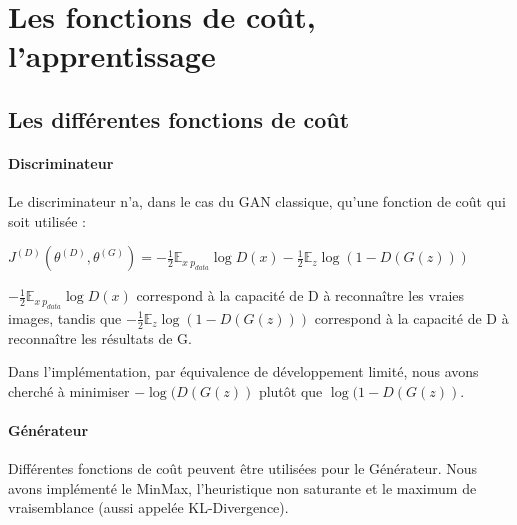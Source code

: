 \section{Les fonctions de coût, l'apprentissage}

\subsection{Les différentes fonctions de coût}
\paragraph{Discriminateur}
Le discriminateur n'a, dans le cas du GAN classique, qu'une fonction de coût qui soit utilisée : \\
\begin{center}
$J^{(D)}(\theta^{(D)}, \theta^{(G)}) = -\frac{1}{2}\mathbb{E}_{x~p_{data}}\log{D(x)}-\frac{1}{2}\mathbb{E}_{z}\log{(1-D(G(z)))}$
\end{center}
\vspace{8pt}
$-\frac{1}{2}\mathbb{E}_{x~p_{data}}\log{D(x)}$ correspond à la capacité de D à reconnaître les vraies images, tandis que $-\frac{1}{2}\mathbb{E}_{z}\log{(1-D(G(z)))}$ correspond à la capacité de D à reconnaître les résultats de G.

\begin{remark}
Dans l'implémentation, par équivalence de développement limité, nous avons cherché à minimiser $-\log{(D(G(z))}$ plutôt que $\log(1-D(G(z))$.
\end{remark}
\paragraph{Générateur}
Différentes fonctions de coût peuvent être utilisées pour le Générateur. Nous avons implémenté le MinMax, l'heuristique non saturante et le maximum de vraisemblance (aussi appelée KL-Divergence). 

